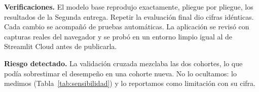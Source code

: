 \documentclass[11pt,a4paper]{article}
\begin{document}
\textbf{Verificaciones.} El modelo base reprodujo exactamente, pliegue por pliegue, los resultados de la Segunda entrega. Repetir la evaluación final dio cifras idénticas. Cada cambio se acompañó de pruebas automáticas. La aplicación se revisó con capturas reales del navegador y se probó en un entorno limpio igual al de Streamlit Cloud antes de publicarla.

\textbf{Riesgo detectado.} La validación cruzada mezclaba las dos cohortes, lo que podía sobrestimar el desempeño en una cohorte nueva. No lo ocultamos: lo medimos (Tabla~\ref{tab:sensibilidad}) y lo reportamos como limitación con su cifra.
\end{document}
